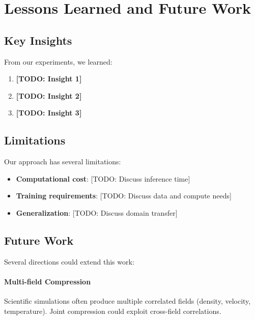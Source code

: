 \section{Lessons Learned and Future Work}
\label{sec:conclusion}


\subsection{Key Insights}


From our experiments, we learned:

\begin{enumerate}
    \item \textbf{[TODO: Insight 1]}

    \item \textbf{[TODO: Insight 2]}

    \item \textbf{[TODO: Insight 3]}
\end{enumerate}

\subsection{Limitations}

Our approach has several limitations:

\begin{itemize}
    \item \textbf{Computational cost}: [TODO: Discuss inference time]
    \item \textbf{Training requirements}: [TODO: Discuss data and compute needs]
    \item \textbf{Generalization}: [TODO: Discuss domain transfer]
\end{itemize}

\subsection{Future Work}

Several directions could extend this work:

\paragraph{Multi-field Compression}
Scientific simulations often produce multiple correlated fields (density, velocity, temperature). Joint compression could exploit cross-field correlations.

